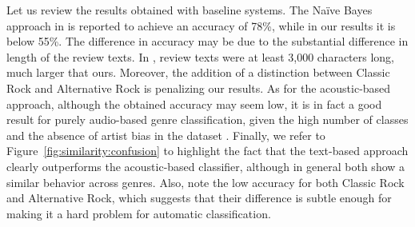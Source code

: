
Let us review the results obtained with baseline systems. The Na\"{i}ve Bayes approach in \cite{Hu2005} is reported to achieve an accuracy of 78\%, while in our results it is below 55\%. The difference in accuracy may be due to the substantial difference in length of the review texts. In \cite{Hu2005}, review texts were at least 3,000 characters long, much larger that ours. Moreover, the addition of a distinction between Classic Rock and Alternative Rock is penalizing our results. 
As for the acoustic-based approach, although the obtained accuracy may seem low, it is in fact a good result for purely audio-based genre classification, given the high number of classes and the absence of artist bias in the dataset \citep{bogdanov2016cross}.
Finally, we refer to Figure~\ref{fig:similarity:confusion} to highlight the fact that the text-based approach clearly outperforms the acoustic-based classifier, although in general both show a similar behavior across genres. Also, note the low accuracy for both Classic Rock and Alternative Rock, which suggests that their difference is subtle enough for making it a hard problem for automatic classification.

